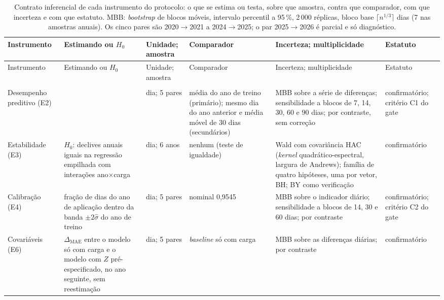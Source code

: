 {\footnotesize
\begin{xltabular}{\linewidth}{@{}>{\raggedright\arraybackslash}p{1.9cm}>{\raggedright\arraybackslash}X>{\raggedright\arraybackslash}p{1.8cm}>{\raggedright\arraybackslash}p{2.6cm}>{\raggedright\arraybackslash}X>{\raggedright\arraybackslash}p{1.9cm}@{}}
\caption[Contrato inferencial de cada instrumento]{Contrato inferencial
  de cada instrumento do protocolo: o que se estima ou testa, sobre que
  amostra, contra que comparador, com que incerteza e com que estatuto.
  MBB: \emph{bootstrap} de blocos móveis, intervalo percentil a 95\,\%,
  2\,000 réplicas, bloco base $\lceil n^{1/3}\rceil$ dias (7 nas amostras
  anuais). Os cinco pares são 2020${\to}$2021 a 2024${\to}$2025; o par
  2025${\to}$2026 é parcial e só diagnóstico.}\label{tab:contrato-inferencial}\\
\toprule
Instrumento & Estimando ou $H_0$ & Unidade; amostra & Comparador & Incerteza; multiplicidade & Estatuto \\
\midrule
\endfirsthead
\toprule
Instrumento & Estimando ou $H_0$ & Unidade; amostra & Comparador & Incerteza; multiplicidade & Estatuto \\
\midrule
\endhead
\midrule
{}\\
\endfoot
\bottomrule
\endlastfoot
    Desempenho preditivo (E2) &  & dia; 5 pares & média do ano de treino (primário); mesmo dia do ano anterior e média móvel de 30 dias (secundários) & MBB sobre a série de diferenças; sensibilidade a blocos de 7, 14, 30, 60 e 90 dias; por contraste, sem correção & confirmatório; critério C1 do gate \\
    \addlinespace
    Estabilidade (E3) & $H_0$: declives anuais iguais na regressão empilhada com interações ano$\times$carga & dia; 6 anos & nenhum (teste de igualdade) & Wald com covariância HAC (\emph{kernel} quadrático-espectral, largura de Andrews); família de quatro hipóteses, uma por vetor, BH; BY como verificação & confirmatório \\
    \addlinespace
    Calibração (E4) & fração de dias do ano de aplicação dentro da banda $\pm2\hat\sigma$ do ano de treino & dia; 5 pares & nominal 0,9545 & MBB sobre o indicador diário; sensibilidade a blocos de 14, 30 e 60 dias; por contraste & confirmatório; critério C2 do gate \\
    \addlinespace
    Covariáveis (E6) & $\Delta_{\mathrm{MAE}}$ entre o modelo só com carga e o modelo com $Z$ pré-especificado, no ano seguinte, sem reestimação & dia; 5 pares & \emph{baseline} só com carga & MBB sobre as diferenças diárias; por contraste & confirmatório \\

\end{xltabular}}
